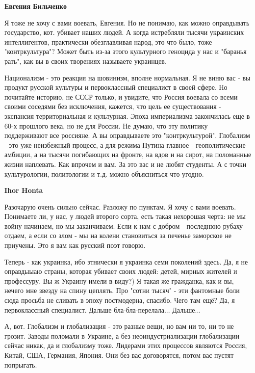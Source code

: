 \begin{itemize}
\begin{itemize}
\textbf{Евгения Бильченко} 

Я тоже не хочу с вами воевать, Евгения. Но не понимаю, как можно оправдывать
государство, кот. убивает наших людей. А когда истребляли тысячи украинских
интеллигентов, практически обезглавливая народ, это что было, тоже
"контркультура"? Может быть из-за этого культурного геноцида у нас и "баранья
рать", как вы в своих творениях называете украинцев. 

Национализм - это реакция на шовинизм, вполне нормальная. Я не виню вас - вы
продукт русской культуры и первоклассный специалист в своей сфере. Но почитайте
историю, не СССР только, и увидите, что Россия воевала со всеми своими соседями
без исключения, кажется, что цель ее существования - экспансия территориальная
и культурная. Эпоха империализма закончилась еще в 60-х прошлого века, но не
для России. Не думаю, что эту политику поддерживают все россияне. А вы
оправдываете это "контркультурой". Глобализм - это уже неизбежный процесс, а
для режима Путина главное - геополитические амбиции, а на тысячи погибающих на
фронте, на вдов и на сирот, на поломанные жизни наплевать. Как впрочем и вам.
За это вас и не любят студенты. А с точки культурологии, политологии и т.д.
можно объясниться что угодно.

 
\textbf{Ihor Honta} 

Разочарую очень сильно сейчас. Разложу по пунктам. Я хочу с вами воевать.
Понимаете ли, у нас, у людей второго сорта, есть такая нехорошая черта: не мы
войну начинаем, но мы заканчиваем. Если к нам с добром - последнюю рубаху
отдаем, а если со злом - мы на колени становиться за печенье заморское не
приучены. Это я вам как русский поэт говорю. 

Теперь - как украинка, ибо этнически я украинка семи поколений здесь. Да, я не
оправдыыаю страны, которая убивает своих людей: детей, мирных жителей и
профессуру. Вы ж Украину имели в виду?) Я такая же гражданка, как и вы, нечего
мне звезду на спину цеплять. Про "сотни тысяч" - эти фантомные боли сюда
просьба не сливать в эпоху постмодерна, спасибо. Чего там ещё? Да, я
первоклассный специалист. Дальше бла-бла-перелала... Дальше... 

А, вот. Глобализм и глобализация - это разные вещи, но вам ни то, ни то не
грозит. Заводы поломали в Украине, а без неоиндустриализации глобализации
сейчас никак, да и глобализму тоже. Лидерами этих процессов являются Россия,
Китай, США, Германия, Япония. Они без вас договорятся, потом вас пустят
попрыгать. 


\end{itemize}
\end{itemize}
